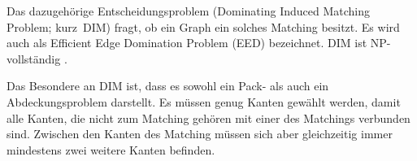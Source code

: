 

Das dazugehörige Entscheidungsproblem (Dominating Induced Matching Problem; kurz~DIM) fragt, ob ein Graph ein solches Matching besitzt. Es wird auch als Efficient Edge Domination Problem (EED) bezeichnet. DIM ist NP-vollständig \cite{dimNPv}.

Das Besondere an DIM ist, dass es sowohl ein Pack- als auch ein Abdeckungsproblem darstellt. Es müssen genug Kanten gewählt werden, damit alle Kanten, die nicht zum Matching gehören mit einer des Matchings verbunden sind. Zwischen den Kanten des Matching müssen sich aber gleichzeitig immer mindestens zwei weitere Kanten befinden.

